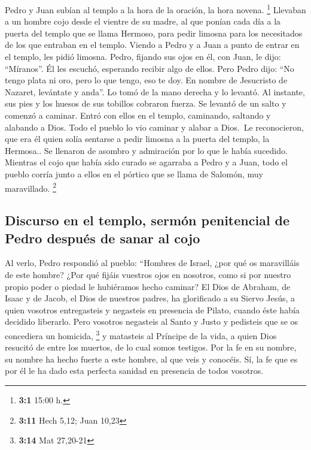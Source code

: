  Pedro y Juan subían al templo a la hora de la oración, la
hora novena. \footnote{\textbf{3:1} 15:00 h.}  Llevaban a
un hombre cojo desde el vientre de su madre, al que ponían cada día a la
puerta del templo que se llama Hermoso, para pedir limosna para los
necesitados de los que entraban en el templo.  Viendo a
Pedro y a Juan a punto de entrar en el templo, les pidió limosna.
 Pedro, fijando sus ojos en él, con Juan, le dijo:
``Míranos''.  Él les escuchó, esperando recibir algo de
ellos.  Pero Pedro dijo: ``No tengo plata ni oro, pero lo
que tengo, eso te doy. En nombre de Jesucristo de Nazaret, levántate y
anda''.  Lo tomó de la mano derecha y lo levantó. Al
instante, sus pies y los huesos de sus tobillos cobraron fuerza.
 Se levantó de un salto y comenzó a caminar. Entró con
ellos en el templo, caminando, saltando y alabando a Dios.
 Todo el pueblo lo vio caminar y alabar a Dios.
 \,Le reconocieron, que era él quien solía sentarse a
pedir limosna a la puerta del templo, la Hermosa.. Se llenaron de
asombro y admiración por lo que le había sucedido. 
Mientras el cojo que había sido curado se agarraba a Pedro y a Juan,
todo el pueblo corría junto a ellos en el pórtico que se llama de
Salomón, muy maravillado. \footnote{\textbf{3:11} Hech 5,12; Juan 10,23}

\hypertarget{discurso-en-el-templo-sermuxf3n-penitencial-de-pedro-despuuxe9s-de-sanar-al-cojo}{%
\subsection{Discurso en el templo, sermón penitencial de Pedro después
de sanar al
cojo}\label{discurso-en-el-templo-sermuxf3n-penitencial-de-pedro-despuuxe9s-de-sanar-al-cojo}}

 Al verlo, Pedro respondió al pueblo: ``Hombres de
Israel, ¿por qué os maravilláis de este hombre? ¿Por qué fijáis vuestros
ojos en nosotros, como si por nuestro propio poder o piedad le
hubiéramos hecho caminar?  El Dios de Abraham, de Isaac y
de Jacob, el Dios de nuestros padres, ha glorificado a su Siervo Jesús,
a quien vosotros entregasteis y negasteis en presencia de Pilato, cuando
éste había decidido liberarlo.  Pero vosotros negasteis
al Santo y Justo y pedisteis que se os concediera un homicida,
\footnote{\textbf{3:14} Mat 27,20-21}  y matasteis al
Príncipe de la vida, a quien Dios resucitó de entre los muertos, de lo
cual somos testigos.  Por la fe en su nombre, su nombre
ha hecho fuerte a este hombre, al que veis y conocéis. Sí, la fe que es
por él le ha dado esta perfecta sanidad en presencia de todos vosotros.

